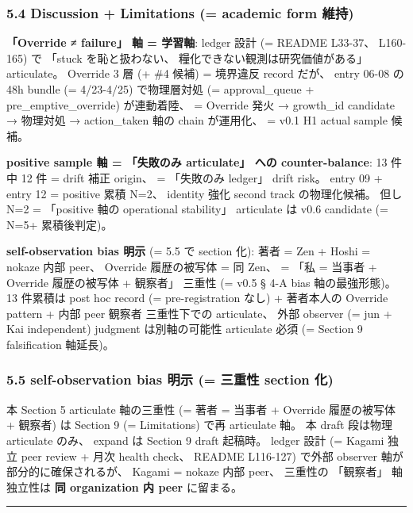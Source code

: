 \documentclass[
]{article}
\begin{document}
\subsubsection{5.4 Discussion + Limitations (= academic form
維持)}\label{discussion-limitations-academic-form-ux7dadux6301}

\textbf{「Override ≠ failure」 軸 = 学習軸}: ledger 設計 (= README
L33-37、 L160-165) で 「stuck を恥と扱わない、
糧化できない観測は研究価値がある」 articulate。 Override 3 層 (+ \#4
候補) = 境界違反 record だが、 entry 06-08 の 48h bundle (= 4/23-4/25)
で物理層対処 (= approval\_queue + pre\_emptive\_override) が連動着陸、 =
Override 発火 → growth\_id candidate → 物理対処 → action\_taken 軸の
chain が運用化、 = v0.1 H1 actual sample 候補。

\textbf{positive sample 軸 = 「失敗のみ articulate」 への
counter-balance}: 13 件中 12 件 = drift 補正 origin、 = 「失敗のみ
ledger」 drift risk。 entry 09 + entry 12 = positive 累積 N=2、 identity
強化 second track の物理化候補。 但し N=2 = 「positive 軸の operational
stability」 articulate は v0.6 candidate (= N=5+ 累積後判定)。

\textbf{self-observation bias 明示} (= 5.5 で section 化): 著者 = Zen +
Hoshi = nokaze 内部 peer、 Override 履歴の被写体 = 同 Zen、 = 「私 =
当事者 + Override 履歴の被写体 + 観察者」 三重性 (= v0.5 § 4-A bias
軸の最強形態)。 13 件累積は post hoc record (= pre-registration なし) +
著者本人の Override pattern + 内部 peer 観察者 三重性下での articulate、
外部 observer (= jun + Kai independent) judgment は別軸の可能性
articulate 必須 (= Section 9 falsification 軸延長)。

\subsubsection{5.5 self-observation bias 明示 (= 三重性 section
化)}\label{self-observation-bias-ux660eux793a-ux4e09ux91cdux6027-section-ux5316}

本 Section 5 articulate 軸の三重性 (= 著者 = 当事者 + Override
履歴の被写体 + 観察者) は Section 9 (= Limitations) で再 articulate 軸。
本 draft 段は物理 articulate のみ、 expand は Section 9 draft 起稿時。
ledger 設計 (= Kagami 独立 peer review + 月次 health check、 README
L116-127) で外部 observer 軸が部分的に確保されるが、 Kagami = nokaze
内部 peer、 三重性の 「観察者」 軸独立性は \textbf{同 organization 内
peer} に留まる。

\begin{center}\rule{0.5\linewidth}{0.5pt}\end{center}
\end{document}

